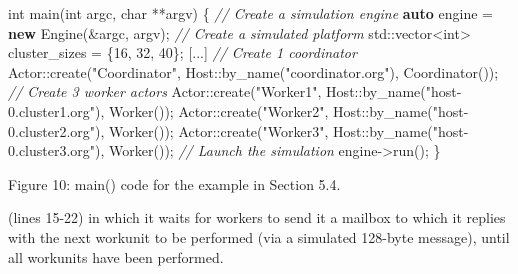\documentclass[
]{article}
\newenvironment{Shaded}{}{}
\newcommand{\BuiltInTok}[1]{\textcolor[rgb]{0.00,0.50,0.00}{#1}}
\newcommand{\CommentTok}[1]{\textcolor[rgb]{0.38,0.63,0.69}{\textit{#1}}}
\newcommand{\DataTypeTok}[1]{\textcolor[rgb]{0.56,0.13,0.00}{#1}}
\newcommand{\DecValTok}[1]{\textcolor[rgb]{0.25,0.63,0.44}{#1}}
\newcommand{\KeywordTok}[1]{\textcolor[rgb]{0.00,0.44,0.13}{\textbf{#1}}}
\newcommand{\NormalTok}[1]{#1}
\newcommand{\OperatorTok}[1]{\textcolor[rgb]{0.40,0.40,0.40}{#1}}
\newcommand{\StringTok}[1]{\textcolor[rgb]{0.25,0.44,0.63}{#1}}
\begin{document}
\begin{Shaded}
\begin{Highlighting}[]
\DataTypeTok{int}\NormalTok{ main}\OperatorTok{(}\DataTypeTok{int}\NormalTok{ argc}\OperatorTok{,} \DataTypeTok{char} \OperatorTok{**}\NormalTok{argv}\OperatorTok{)} \OperatorTok{\{}
    \CommentTok{// Create a simulation engine}
    \KeywordTok{auto}\NormalTok{ engine }\OperatorTok{=} \KeywordTok{new}\NormalTok{ Engine}\OperatorTok{(\&}\NormalTok{argc}\OperatorTok{,}\NormalTok{ argv}\OperatorTok{);}
    \CommentTok{// Create a simulated platform}
    \BuiltInTok{std::}\NormalTok{vector}\OperatorTok{\textless{}}\DataTypeTok{int}\OperatorTok{\textgreater{}}\NormalTok{ cluster\_sizes }\OperatorTok{=} \OperatorTok{\{}\DecValTok{16}\OperatorTok{,} \DecValTok{32}\OperatorTok{,} \DecValTok{40}\OperatorTok{\};}
    \OperatorTok{[...]}
    \CommentTok{// Create 1 coordinator}
\NormalTok{    Actor}\OperatorTok{::}\NormalTok{create}\OperatorTok{(}\StringTok{"Coordinator"}\OperatorTok{,}
\NormalTok{    Host}\OperatorTok{::}\NormalTok{by\_name}\OperatorTok{(}\StringTok{"coordinator.org"}\OperatorTok{),}\NormalTok{ Coordinator}\OperatorTok{());}
    \CommentTok{// Create 3 worker actors}
\NormalTok{    Actor}\OperatorTok{::}\NormalTok{create}\OperatorTok{(}\StringTok{"Worker1"}\OperatorTok{,}
\NormalTok{    Host}\OperatorTok{::}\NormalTok{by\_name}\OperatorTok{(}\StringTok{"host{-}0.cluster1.org"}\OperatorTok{),}\NormalTok{ Worker}\OperatorTok{());}
\NormalTok{    Actor}\OperatorTok{::}\NormalTok{create}\OperatorTok{(}\StringTok{"Worker2"}\OperatorTok{,}
\NormalTok{    Host}\OperatorTok{::}\NormalTok{by\_name}\OperatorTok{(}\StringTok{"host{-}0.cluster2.org"}\OperatorTok{),}\NormalTok{ Worker}\OperatorTok{());}
\NormalTok{    Actor}\OperatorTok{::}\NormalTok{create}\OperatorTok{(}\StringTok{"Worker3"}\OperatorTok{,}
\NormalTok{    Host}\OperatorTok{::}\NormalTok{by\_name}\OperatorTok{(}\StringTok{"host{-}0.cluster3.org"}\OperatorTok{),}\NormalTok{ Worker}\OperatorTok{());}
    \CommentTok{// Launch the simulation}
\NormalTok{    engine}\OperatorTok{{-}\textgreater{}}\NormalTok{run}\OperatorTok{();}
\OperatorTok{\}} 
\end{Highlighting}
\end{Shaded}

Figure 10: main() code for the example in Section 5.4.

(lines 15-22) in which it waits for workers to send it a mailbox to
which it replies with the next workunit to be performed (via a simulated
128-byte message), until all workunits have been performed.
\end{document}
